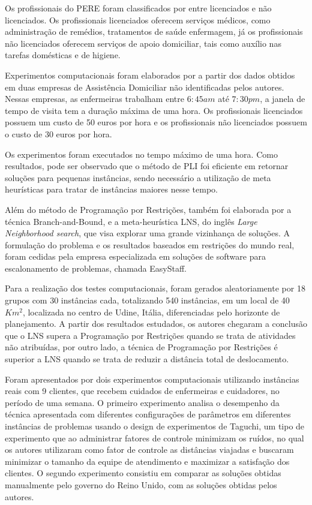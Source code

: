 Os profissionais do \ac{PERE} foram classificados por  entre licenciados e não licenciados. Os profissionais licenciados oferecem serviços médicos, como administração de remédios, tratamentos de saúde enfermagem, já os profissionais não licenciados oferecem serviços de apoio domiciliar, tais como auxílio nas tarefas domésticas e de higiene.

Experimentos computacionais foram elaborados por  a partir dos dados obtidos em duas empresas de Assistência Domiciliar não identificadas pelos autores. Nessas empresas, as enfermeiras trabalham entre $6:45 am$ até $7:30 pm$, a janela de tempo de visita tem a duração máxima de uma hora. Os profissionais licenciados possuem um custo de 50 euros por hora e os profissionais não licenciados possuem o custo de 30 euros por hora.

Os experimentos foram executados no tempo máximo de uma hora. Como resultados, pode ser observado que o método de \ac{PLI} foi eficiente em retornar soluções para pequenas instâncias, sendo necessário a utilização de meta heurísticas para tratar de instâncias maiores nesse tempo.

Além do método de Programação por Restrições, também foi elaborada por  a técnica Branch-and-Bound, e a meta-heurística LNS, do inglês \textit{Large Neighborhood search}, que visa explorar uma grande vizinhança de soluções. A formulação do problema e os resultados baseados em restrições do mundo real, foram cedidas pela empresa especializada em soluções de software para escalonamento de problemas, chamada EasyStaff.

Para a realização dos testes computacionais, foram gerados aleatoriamente por  18 grupos com 30 instâncias cada, totalizando 540 instâncias, em um local de 40 $Km^{2}$, localizada no centro de Udine, Itália, diferenciadas pelo horizonte de planejamento. 
A partir dos resultados estudados, os autores chegaram a conclusão que o LNS supera a Programação por Restrições quando se trata de atividades não atribuídas, por outro lado, a técnica de Programação por Restrições é superior a LNS quando se trata de reduzir a distância total de deslocamento.


Foram apresentados por  dois experimentos computacionais utilizando instâncias reais com 9 clientes, que recebem cuidados de enfermeiras e cuidadores, no período de uma semana.
O primeiro experimento analisa o desempenho da técnica apresentada com diferentes configurações de parâmetros em diferentes instâncias de problemas usando o design de experimentos de Taguchi, um tipo de experimento que ao administrar fatores de controle minimizam os ruídos, no qual os autores utilizaram como fator de controle as distâncias viajadas e buscaram minimizar o tamanho da equipe de atendimento e maximizar a satisfação dos clientes. 
O segundo experimento consistiu em comparar as soluções obtidas manualmente pelo governo do Reino Unido, com as soluções obtidas pelos autores.

